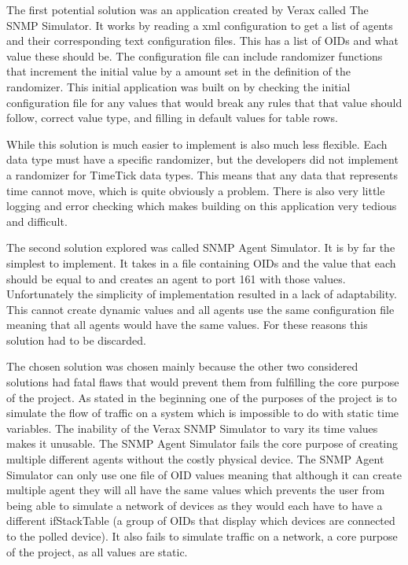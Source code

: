 \documentclass[12pt]{article}
\begin{document}
The first potential solution was an application created by Verax called The SNMP Simulator. It works by reading a xml configuration to get a list of agents and their corresponding text configuration files. This has a list of OIDs and what value these should be. The configuration file can include randomizer functions that increment the initial value by a amount set in the definition of the randomizer. This initial application was built on by checking the initial configuration file for any values that would break any rules that that value should follow, correct value type, and filling in default values for table rows.

While this solution is much easier to implement is also much less flexible. Each data type must have a specific randomizer, but the developers did not implement a randomizer for TimeTick data types. This means that any data that represents time cannot move, which is quite obviously a problem. There is also very little logging and error checking which makes building on this application very tedious and difficult.

The second solution explored was called SNMP Agent Simulator. It is by far the simplest to implement. It takes in a file containing OIDs and the value that each should be equal to and creates an agent to port 161 with those values. Unfortunately the simplicity of implementation resulted in a lack of adaptability. This cannot create dynamic values and all agents use the same configuration file meaning that all agents would have the same values. For these reasons this solution had to be discarded.

The chosen solution was chosen mainly because the other two considered solutions had fatal flaws that would prevent them from fulfilling the core purpose of the project. As stated in the beginning one of the purposes of the project is to simulate the flow of traffic on a system which is impossible to do with static time variables. The inability of the Verax SNMP Simulator to vary its time values makes it unusable.  The SNMP Agent Simulator fails the core purpose of creating multiple different agents without the costly physical device. The SNMP Agent Simulator can only use one file of OID values meaning that although it can create multiple agent they will all have the same values which prevents the user from being able to simulate a network of devices as they would each have to have a different ifStackTable (a group of OIDs that display which devices are connected to the polled device). It also fails to simulate traffic on a network, a core purpose of the project, as all values are static. 
\end{document}
